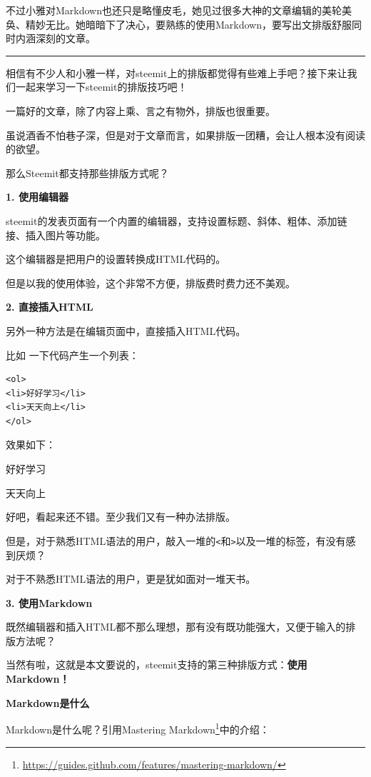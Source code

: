 \documentclass[]{ctexbook}
\renewcommand{\href}[2]{#2\footnote{\url{#1}}}
\begin{document}
不过小雅对Markdown也还只是略懂皮毛，她见过很多大神的文章编辑的美轮美奂、精妙无比。她暗暗下了决心，要熟练的使用Markdown，要写出文排版舒服同时内涵深刻的文章。

\begin{center}\rule{0.5\linewidth}{\linethickness}\end{center}

相信有不少人和小雅一样，对steemit上的排版都觉得有些难上手吧？接下来让我们一起来学习一下steemit的排版技巧吧！

一篇好的文章，除了内容上乘、言之有物外，排版也很重要。

虽说酒香不怕巷子深，但是对于文章而言，如果排版一团糟，会让人根本没有阅读的欲望。

那么Steemit都支持那些排版方式呢？

\textbf{1. 使用编辑器}

steemit的发表页面有一个内置的编辑器，支持设置标题、斜体、粗体、添加链接、插入图片等功能。

这个编辑器是把用户的设置转换成HTML代码的。

但是以我的使用体验，这个非常不方便，排版费时费力还不美观。

\textbf{2. 直接插入HTML}

另外一种方法是在编辑页面中，直接插入HTML代码。

比如 一下代码产生一个列表：

\begin{verbatim}
<ol>
<li>好好学习</li>
<li>天天向上</li>
</ol>
\end{verbatim}

效果如下：

好好学习

天天向上

好吧，看起来还不错。至少我们又有一种办法排版。

但是，对于熟悉HTML语法的用户，敲入一堆的\texttt{\textless{}}和\texttt{\textgreater{}}以及一堆的标签，有没有感到厌烦？

对于不熟悉HTML语法的用户，更是犹如面对一堆天书。

\textbf{3. 使用Markdown}

既然编辑器和插入HTML都不那么理想，那有没有既功能强大，又便于输入的排版方法呢？

当然有啦，这就是本文要说的，steemit支持的第三种排版方式：\textbf{使用Markdown！}

\textbf{Markdown是什么}

Markdown是什么呢？引用\href{https://guides.github.com/features/mastering-markdown/}{Mastering Markdown}中的介绍：
\end{document}
